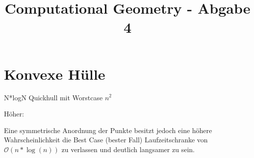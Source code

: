 \documentclass[conference]{IEEEtran}
\begin{document}
	
	\title{Computational Geometry - Abgabe 4}
	
	\author{
	}
	
	\maketitle
	
	\begin{abstract}
		
		
	\end{abstract}
	
	\section{Konvexe Hülle}
	 N*logN Quickhull mit Worstcase $n^2$
	
	Höher: 
	
	Eine symmetrische Anordnung der Punkte besitzt jedoch eine höhere Wahrscheinlichkeit die Best Case (bester Fall) Laufzeitschranke von $\mathcal{O}(n * \log(n))$ zu verlassen und deutlich langsamer zu sein. 
	
\end{document}
